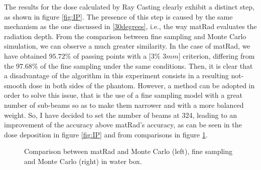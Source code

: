 \documentclass[12pt, a4paper, twoside]{book}
\begin{document}
The results for the dose calculated by Ray Casting clearly exhibit a distinct step, as shown in figure \ref{fig:IP}. The presence of this step is caused by the same mechanism as the one discussed in \ref{30degrees}, i.e., the way matRad evaluates the radiation depth. 
From the comparison between fine sampling and Monte Carlo simulation, we can observe a much greater similarity.
In the case of matRad, we have obtained $95.72\%$ of passing points with a [$3\%$ $3mm$] criterion, differing from the $97.68\%$ of the fine sampling under the same conditions. 
Then, it is clear that a disadvantage of the algorithm in this experiment consists in a resulting not-smooth dose in both sides of the phantom. However, a method can be adopted in order to solve this issue, that is the use of a fine sampling model with a great number of sub-beams so as to make them narrower and with a more balanced weight. So, I have decided to set the number of beams at 324, leading to an improvement of the accuracy above matRad's accuracy, as can be seen in the dose deposition in figure \ref{fig:IP} and from comparisons in figure \ref{fig:IPgam}.
\begin{figure}[!ht]
\centering
{} 
\caption{Comparison between matRad and Monte Carlo (left), fine sampling and Monte Carlo (right) in water box.}
\label{fig:IPgam}
\end{figure}
\end{document}
